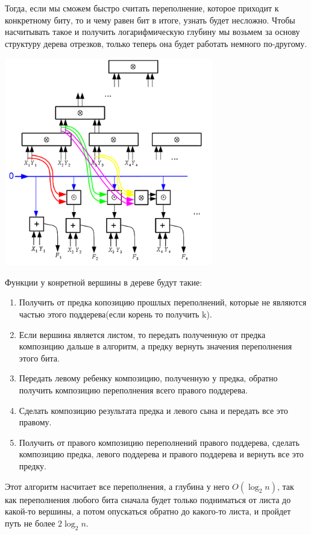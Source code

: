 Тогда, если мы сможем быстро считать переполнение, которое приходит к конкретному биту, то и чему равен бит в итоге, узнать будет несложно. Чтобы насчитывать такое и получить логарифмическую глубину мы возьмем за основу структуру дерева отрезков, только теперь она будет работать немного по-другому. 
\begin{center}
  \includegraphics[height=9.1cm]{assets/summ.png}
\end{center}
Функции у конретной вершины в дереве будут такие:
\begin{enumerate}
    \item Получить от предка копозицию прошлых переполнений, которые не являются частью этого поддерева(если корень то получить k).
    \item Если вершина является листом, то передать полученную от предка композицию дальше в алгоритм, а предку вернуть значения переполнения этого бита.
    \item Передать левому ребенку композицию, полученную у предка, обратно получить композицию переполнения всего правого поддерева.
    \item Сделать композицию результата предка и левого сына и передать все это правому.
    \item Получить от правого композицию переполнений правого поддерева, сделать композицию предка, левого поддерева и правого поддерева и вернуть все это предку.
\end{enumerate}

Этот алгоритм насчитает все переполнения, а глубина у него $O(\log_2n)$, так как переполнения любого бита сначала будет только подниматься от листа до какой-то вершины, а потом опускаться обратно до какого-то листа, и пройдет путь не более $2\log_2n$.

